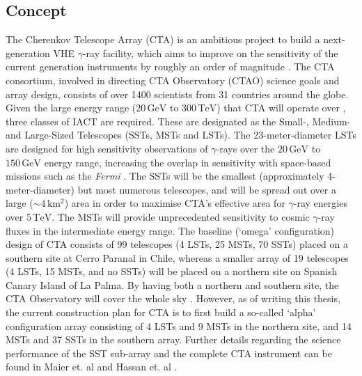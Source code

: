 \subsection{Concept}
The Cherenkov Telescope Array (CTA) is an ambitious project to build a next-generation VHE $\gamma$-ray facility, which aims to improve on the sensitivity of the current generation instruments by roughly an order of magnitude \cite{scienceCTA}. The CTA consortium, involved in directing CTA Observatory (CTAO) science goals and array design, consists of over 1400 scientists from 31 countries around the globe. Given the large energy range ($\mathrm{20\,GeV}$ to $\mathrm{300\,TeV}$) that CTA will operate  over \cite{scienceCTA}, three classes of IACT are required. These are designated as the Small-, Medium- and Large-Sized Telescopes (SSTs, MSTs and LSTs). The 23-meter-diameter LSTs are designed for high sensitivity observations of $\gamma$-rays over the $\mathrm{20\,GeV}$ to $\mathrm{150\,GeV}$ energy range, increasing the overlap in sensitivity with space-based missions such as the \textit{Fermi} \cite{Fermi}. The SSTs will be the smallest (approximately 4-meter-diameter) but most numerous telescopes, and will be spread out over a large ($\mathrm{\sim 4\,km^2}$) area in order to maximise CTA's effective area for $\gamma$-ray energies over $\mathrm{5\,TeV}$. The MSTs will provide unprecedented sensitivity to cosmic $\gamma$-ray fluxes in the intermediate energy range. The baseline (`omega' configuration) design of CTA consists of 99 telescopes (4 LSTs, 25 MSTs, 70 SSTs) placed on a southern site at Cerro Paranal in Chile, whereas a smaller array of 19 telescopes (4 LSTs, 15 MSTs, and no SSTs) will be placed on a northern site on Spanish Canary Island of La Palma. By having both a northern and southern site, the CTA Observatory will cover the whole sky \cite{scienceCTA}. However, as of writing this thesis, the current construction plan for CTA is to first build a so-called `alpha' configuration array consisting of 4 LSTs and 9 MSTs in the northern site, and 14 MSTs and 37 SSTs in the southern array. Further details regarding the science performance of the SST sub-array and the complete CTA instrument can be found in Maier et. al \cite{gernotCTA} and Hassan et. al \cite{tarekCTA}.
